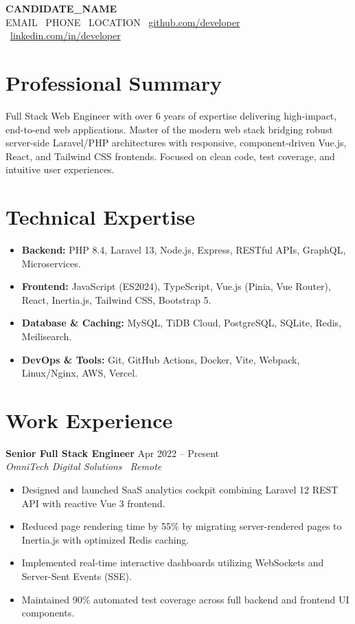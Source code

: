 \documentclass[10pt,a4paper]{article}
\begin{document}
\begin{center}
    {\huge \textbf{{{CANDIDATE_NAME}}}}\\[3pt]
    \small {{EMAIL}} \textbar\ {{PHONE}} \textbar\ {{LOCATION}} \textbar\ \href{https://github.com/candidate}{github.com/developer} \textbar\ \href{https://linkedin.com/in/candidate}{linkedin.com/in/developer}
\end{center}

\vspace{-4pt}
\section{Professional Summary}
Full Stack Web Engineer with over 6 years of expertise delivering high-impact, end-to-end web applications. Master of the modern web stack bridging robust server-side Laravel/PHP architectures with responsive, component-driven Vue.js, React, and Tailwind CSS frontends. Focused on clean code, test coverage, and intuitive user experiences.

\section{Technical Expertise}
\begin{itemize}
    \item \textbf{Backend:} PHP 8.4, Laravel 13, Node.js, Express, RESTful APIs, GraphQL, Microservices.
    \item \textbf{Frontend:} JavaScript (ES2024), TypeScript, Vue.js (Pinia, Vue Router), React, Inertia.js, Tailwind CSS, Bootstrap 5.
    \item \textbf{Database \& Caching:} MySQL, TiDB Cloud, PostgreSQL, SQLite, Redis, Meilisearch.
    \item \textbf{DevOps \& Tools:} Git, GitHub Actions, Docker, Vite, Webpack, Linux/Nginx, AWS, Vercel.
\end{itemize}

\section{Work Experience}
\textbf{Senior Full Stack Engineer} \hfill Apr 2022 -- Present\\
\textit{OmniTech Digital Solutions \textbar\ Remote}
\begin{itemize}
    \item Designed and launched SaaS analytics cockpit combining Laravel 12 REST API with reactive Vue 3 frontend.
    \item Reduced page rendering time by 55\% by migrating server-rendered pages to Inertia.js with optimized Redis caching.
    \item Implemented real-time interactive dashboards utilizing WebSockets and Server-Sent Events (SSE).
    \item Maintained 90\% automated test coverage across full backend and frontend UI components.
\end{itemize}
\end{document}
